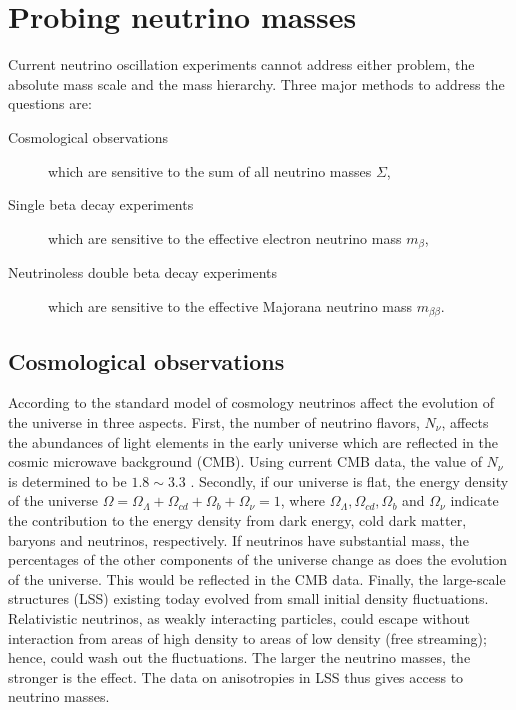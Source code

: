 \section{Probing neutrino masses}
\label{sec:pnm}
Current neutrino oscillation experiments cannot address either
problem, the absolute mass scale and the mass hierarchy. Three major
methods to address the questions are:
\begin{description}
\item[Cosmological observations] which are sensitive to the sum of all
neutrino masses $\Sigma$,
\item[Single beta decay experiments] which are sensitive to the
effective electron neutrino mass $m_{\beta}$,
\item[Neutrinoless double beta decay experiments] which are sensitive
to the effective Majorana neutrino mass $m_{\beta\beta}$.
\end{description}

\subsection{Cosmological observations}
\label{sec:coob}
According to the standard model of cosmology neutrinos affect the
evolution of the universe in three aspects. First, the number of
neutrino flavors, $N_{\nu}$, affects the abundances of light elements
in the early universe which are reflected in the cosmic microwave
background (CMB). Using current CMB data, the value of $N_{\nu}$ is
determined to be $1.8 \sim 3.3$ \cite{Oli02}. Secondly, if our
universe is flat, the energy density of the universe $\Omega =
\Omega_{\Lambda} + \Omega_{cd} + \Omega_{b} + \Omega_{\nu} = 1$, where
$\Omega_{\Lambda}, \Omega_{cd}, \Omega_{b}$ and $\Omega_{\nu}$
indicate the contribution to the energy density from dark energy, cold
dark matter, baryons and neutrinos, respectively. If neutrinos have
substantial mass, the percentages of the other components of the
universe change as does the evolution of the universe. This would be
reflected in the CMB data. Finally, the large-scale structures (LSS)
existing today evolved from small initial density
fluctuations. Relativistic neutrinos, as weakly interacting particles,
could escape without interaction from areas of high density to areas
of low density (free streaming); hence, could wash out the
fluctuations. The larger the neutrino masses, the stronger is the
effect. The data on anisotropies in LSS thus gives access to neutrino
masses.

